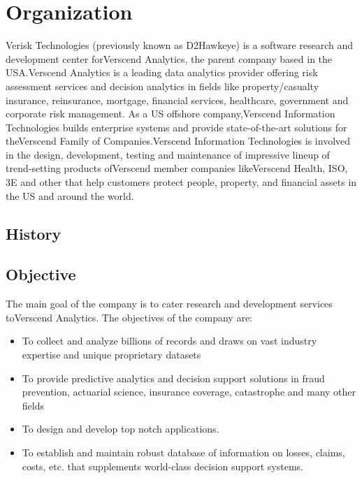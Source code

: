 \section{Organization}
Verisk Technologies (previously known as D2Hawkeye) is a software research and development
center forVerscend Analytics, the parent company based in the USA.Verscend Analytics is a leading data analytics
provider offering risk assessment services and decision analytics in fields like property/casualty insurance,
reinsurance, mortgage, financial services, healthcare, government and corporate risk management. As a US
offshore company,Verscend Information Technologies builds enterprise systems and provide state-of-the-art
solutions for theVerscend Family of Companies.Verscend Information Technologies is involved in the design,
development, testing and maintenance of impressive lineup of trend-setting products ofVerscend member
companies likeVerscend Health, ISO, 3E and other that help customers protect people, property, and financial
assets in the US and around the world.
\subsection{History}
\subsection{Objective}
The main goal of the company is to cater research and development services toVerscend Analytics. The
objectives of the company are:
\begin{itemize}
\item To collect and analyze billions of records and draws on vast industry expertise and unique proprietary
datasets
\item To provide predictive analytics and decision support solutions in fraud prevention, actuarial science,
insurance coverage, catastrophe and many other fields
\item To design and develop top notch applications.
\item To establish and maintain robust database of information on losses, claims, costs, etc. that supplements
world-class decision support systems.
\end{itemize}
